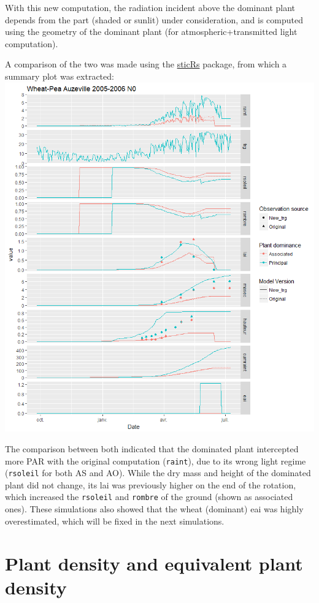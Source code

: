 \documentclass[]{book}
\theoremstyle{definition}
\theoremstyle{definition}
\theoremstyle{definition}
\theoremstyle{remark}
\begin{document}
With this new computation, the radiation incident above the dominant
plant depends from the part (shaded or sunlit) under consideration, and
is computed using the geometry of the dominant plant (for
atmospheric+transmitted light computation).

A comparison of the two was made using the
\href{https://github.com/VEZY/sticRs}{sticRs} package, from which a
summary plot was extracted: \includegraphics{img/trg-computation.png}

The comparison between both indicated that the dominated plant
intercepted more PAR with the original computation (\texttt{raint}), due
to its wrong light regime (\texttt{rsoleil} for both AS and AO). While
the dry mass and height of the dominated plant did not change, its lai
was previously higher on the end of the rotation, which increased the
\texttt{rsoleil} and \texttt{rombre} of the ground (shown as associated
ones). These simulations also showed that the wheat (dominant) eai was
highly overestimated, which will be fixed in the next simulations.

\chapter{Plant density and equivalent plant density}\label{plantdensity}
\end{document}
